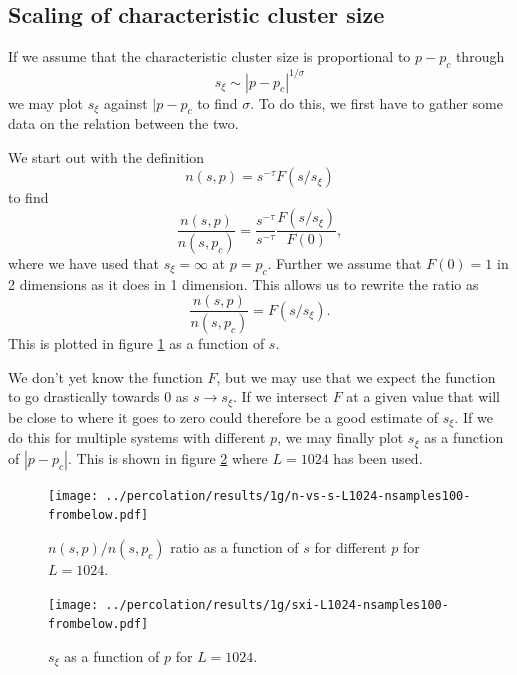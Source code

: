 \documentclass[a4paper,reprint,floatfix,amsmath,amssymb,aps,pra]{revtex4-1}
\begin{document}
\subsection{Scaling of characteristic cluster size}

If we assume that the characteristic cluster size is proportional to $p - p_{c}$ through
\begin{equation}
  s_{\xi} \sim |p - p_{c}|^{1/\sigma}
\end{equation} 
we may plot $s_{\xi}$ against $|p-p_{c}$ to find $\sigma$. To do this, we first have to gather some data on the relation between the two.

We start out with the definition
\begin{equation}
  n(s,p) = s^{-\tau} F(s/s_{\xi})
\end{equation} 
to find
\begin{equation}
  \frac{n(s,p)}{n(s,p_{c})} = \frac{s^{-\tau}}{s^{-\tau}} \frac{F(s/s_{\xi})}{F(0)},
\end{equation} 
where we have used that $s_{\xi} = \infty$ at $p=p_{c}$. Further we assume that $F(0) = 1$ in 2 dimensions as it does in 1 dimension. This allows us to rewrite the ratio as
\begin{equation}
  \frac{n(s,p)}{n(s,p_{c})} = F(s/s_{\xi}).
\end{equation}
This is plotted in figure \ref{fig:scaling-ratio} as a function of $s$.

We don't yet know the function $F$, but we may use that we expect the function to go drastically towards $0$ as $s\to s_{\xi}$. If we intersect $F$ at a given value that will be close to where it goes to zero could therefore be a good estimate of $s_{\xi}$. If we do this for multiple systems with different $p$, we may finally plot $s_{\xi}$ as a function of $|p-p_{c}|$. This is shown in figure \ref{fig:sxi-vs-p} where $L = 1024$ has been used.
\begin{figure}
  \centering
  \texttt{[image: ../percolation/results/1g/n-vs-s-L1024-nsamples100-frombelow.pdf]}
  \caption{$n(s,p)/n(s,p_{c})$ ratio as a function of $s$ for different $p$ for $L=1024$.}
  \label{fig:scaling-ratio}
\end{figure}
\begin{figure}
  \centering
  \texttt{[image: ../percolation/results/1g/sxi-L1024-nsamples100-frombelow.pdf]}
  \caption{$s_{\xi}$ as a function of $p$ for $L=1024$.}
  \label{fig:sxi-vs-p}
\end{figure}
\end{document}
